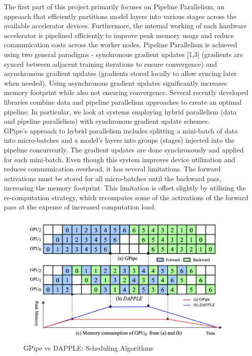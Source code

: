 \documentclass[conference]{IEEEtran}
\begin{document}
The first part of this project primarily focuses on Pipeline Parallelism, an approach that efficiently partitions model layers into various stages across the available accelerator devices. Furthermore, the internal working of each hardware accelerator is pipelined efficiently to improve peak memory usage and reduce communication costs across the worker nodes. Pipeline Parallelism is achieved using two general paradigms - synchronous gradient updates [1,3] (gradients are synced between adjacent training iterations to ensure convergence) and asynchronous gradient updates \cite{b2} (gradients stored locally to allow syncing later when needed). Using asynchronous gradient updates significantly increases memory footprint while also not ensuring convergence. Several recently developed libraries combine data and pipeline parallelism approaches to create an optimal pipeline. In particular, we look at systems employing hybrid parallelism (data and pipeline parallelism) with synchronous gradient update schemes. \\

GPipe's approach \cite{b1} to hybrid parallelism includes splitting a mini-batch of data into micro-batches and a model's layers into groups (stages) injected into the pipeline concurrently. The gradient updates are done synchronously and applied for each mini-batch. Even though this system improves device utilization and reduces communication overhead, it has several limitations. The forward activations must be stored for all micro-batches until the backward pass, increasing the memory footprint. This limitation is offset slightly by utilizing the re-computation strategy, which recomputes some of the activations of the forward pass at the expense of increased computation load.  \\
\begin{figure}[b]
	\centering
	\includegraphics[scale=0.22]{GPipe_vs_DAPPLE.jpeg}
	\caption{GPipe vs DAPPLE: Scheduling Algorithms \cite{b4}}
	\label{fig}
\end{figure}
\end{document}
